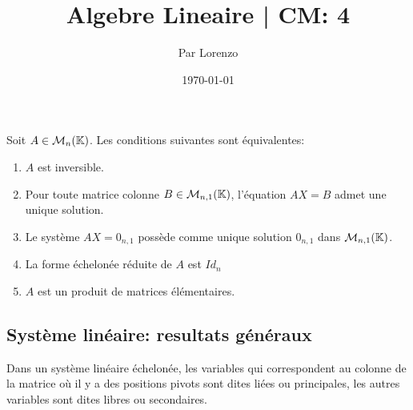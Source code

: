 \documentclass[a4paper, 12pt]{article}
\title{Algebre Lineaire | CM: 4}
\author{Par Lorenzo}
\date{\today}
\begin{document}
\maketitle

\begin{theorem}
    Soit $A \in \mathcal{M}_n(\mathbb{K})$. Les conditions suivantes sont équivalentes:
    \begin{enumerate}
        \item $A$ est inversible.
        \item Pour toute matrice colonne $B \in \mathcal{M}_{n, 1}(\mathbb{K})$, l'équation $AX = B$ admet une unique solution.
        \item Le système $AX = 0_{n,1}$ possède comme unique solution $0_{n,1}$ dans $\mathcal{M}_{n, 1}(\mathbb{K})$.
        \item La forme échelonée réduite de $A$ est $Id_n$
        \item $A$ est un produit de matrices élémentaires.
    \end{enumerate}
\end{theorem}


\subsection{Système linéaire: resultats généraux}

\begin{definition}
    Dans un système linéaire échelonée, les variables qui correspondent au colonne de la matrice où il y a des positions pivots sont dites
    liées ou principales, les autres variables sont dites libres ou secondaires.
\end{definition}

\end{document}
